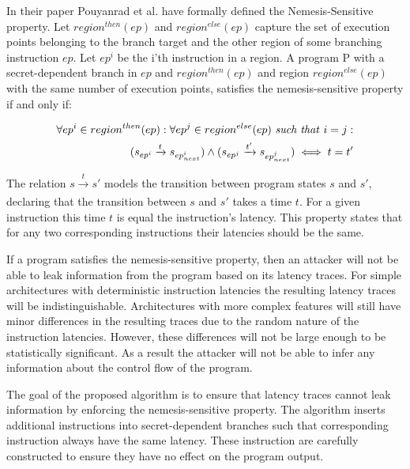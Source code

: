In their paper Pouyanrad et al. \cite{MSP430Detection} have formally defined the Nemesis-Sensitive property.
Let $region^{then}(ep)$ and $region^{else}(ep)$ capture the set of execution points belonging to the branch target and the other region of some branching instruction $ep$.
Let $ep^i$ be the i'th instruction in a region. A program P with a secret-dependent branch in $ep$ and $region^{then}(ep)$ 
and region $region^{else}(ep)$ with the same number of execution points, satisfies the nemesis-sensitive property if and only if:  

\begin{equation} \label{eq:nemesisProperty}
    \begin{split}
    \forall ep^i \in region^{then}(ep) : \forall ep^j \in region^{else}(ep) \text{ \textit{such that} } i=j :  \\ 
    (s_{ep^i} \xrightarrow[]{t} s_{ep^i_{next}}) \land (s_{ep^j} \xrightarrow[]{t'} s_{ep^j_{next}}) \iff t = t' \\ 
    \end{split}
\end{equation}


The relation $s \xrightarrow[]{t} s'$ models the transition between program states $s$ and $s'$, declaring that the transition between $s$ and $s'$ takes a time $t$. 
For a given instruction this time $t$ is equal the instruction's latency. This property states that for any two corresponding instructions their latencies should be the same.

If a program satisfies the nemesis-sensitive property, then an attacker will not be able to leak information from the program based on its latency traces.
For simple architectures with deterministic instruction latencies the resulting latency traces will be indistinguishable. 
Architectures with more complex features will still have minor differences in the resulting traces due to the random nature of the instruction latencies. 
However, these differences will not be large enough to be statistically significant.
As a result the attacker will not be able to infer any information about the control flow of the program. 

The goal of the proposed algorithm is to ensure that latency traces cannot leak information by enforcing the nemesis-sensitive property.
The algorithm inserts additional instructions into secret-dependent branches such that corresponding instruction always have the same latency. 
These instruction are carefully constructed to ensure they have no effect on the program output. 


